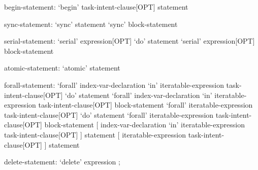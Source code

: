 \begin{syntax}
begin-statement:
  `begin' task-intent-clause[OPT] statement
\end{syntax}

\begin{syntax}
sync-statement:
  `sync' statement
  `sync' block-statement
\end{syntax}

\begin{syntax}
serial-statement:
  `serial' expression[OPT] `do' statement
  `serial' expression[OPT] block-statement
\end{syntax}

\begin{syntax}
atomic-statement:
  `atomic' statement
\end{syntax}

\begin{syntax}
forall-statement:
  `forall' index-var-declaration `in' iteratable-expression task-intent-clause[OPT] `do' statement
  `forall' index-var-declaration `in' iteratable-expression task-intent-clause[OPT] block-statement
  `forall' iteratable-expression task-intent-clause[OPT] `do' statement
  `forall' iteratable-expression task-intent-clause[OPT] block-statement
  [ index-var-declaration `in' iteratable-expression task-intent-clause[OPT] ] statement
  [ iteratable-expression task-intent-clause[OPT] ] statement
\end{syntax}

\begin{syntax}
delete-statement:
  `delete' expression ;
\end{syntax}

